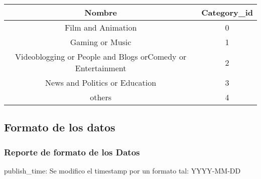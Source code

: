             \begin{center}
                \begin{tabular}{||c | c||}
                    \hline
                    \textbf{Nombre} & \textbf{Category\_id} \\ [0.5ex]
                    \hline\hline
                    Film and Animation & 0 \\
                    \hline
                    Gaming or Music & 1 \\
                    \hline
                    Videoblogging or People and Blogs orComedy or Entertainment & 2 \\
                    \hline
                    News and Politics or Education & 3 \\
                    \hline
                    others & 4 \\
                    \hline
                \end{tabular}
            \end{center}

\subsection{Formato de los datos}
    \subsubsection{Reporte de formato de los Datos}
        publish\_time: Se modifico el timestamp por un formato tal: YYYY-MM-DD

